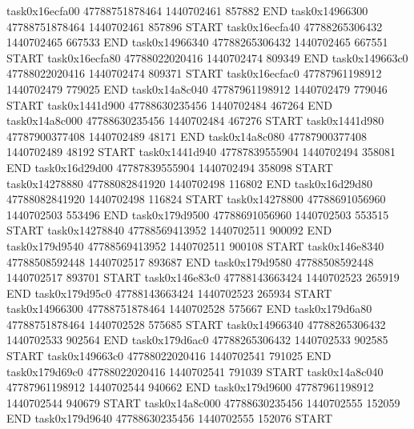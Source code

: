 task0x16ecfa00 47788751878464          1440702461               857882  END
task0x14966300 47788751878464          1440702461               857896  START
task0x16ecfa40 47788265306432          1440702465               667533  END
task0x14966340 47788265306432          1440702465               667551  START
task0x16ecfa80 47788022020416          1440702474               809349  END
task0x149663c0 47788022020416          1440702474               809371  START
task0x16ecfac0 47787961198912          1440702479               779025  END
task0x14a8c040 47787961198912          1440702479               779046  START
task0x1441d900 47788630235456          1440702484               467264  END
task0x14a8c000 47788630235456          1440702484               467276  START
task0x1441d980 47787900377408          1440702489                48171  END
task0x14a8c080 47787900377408          1440702489                48192  START
task0x1441d940 47787839555904          1440702494               358081  END
task0x16d29d00 47787839555904          1440702494               358098  START
task0x14278880 47788082841920          1440702498               116802  END
task0x16d29d80 47788082841920          1440702498               116824  START
task0x14278800 47788691056960          1440702503               553496  END
task0x179d9500 47788691056960          1440702503               553515  START
task0x14278840 47788569413952          1440702511               900092  END
task0x179d9540 47788569413952          1440702511               900108  START
task0x146e8340 47788508592448          1440702517               893687  END
task0x179d9580 47788508592448          1440702517               893701  START
task0x146e83c0 47788143663424          1440702523               265919  END
task0x179d95c0 47788143663424          1440702523               265934  START
task0x14966300 47788751878464          1440702528               575667  END
task0x179d6a80 47788751878464          1440702528               575685  START
task0x14966340 47788265306432          1440702533               902564  END
task0x179d6ac0 47788265306432          1440702533               902585  START
task0x149663c0 47788022020416          1440702541               791025  END
task0x179d69c0 47788022020416          1440702541               791039  START
task0x14a8c040 47787961198912          1440702544               940662  END
task0x179d9600 47787961198912          1440702544               940679  START
task0x14a8c000 47788630235456          1440702555               152059  END
task0x179d9640 47788630235456          1440702555               152076  START
